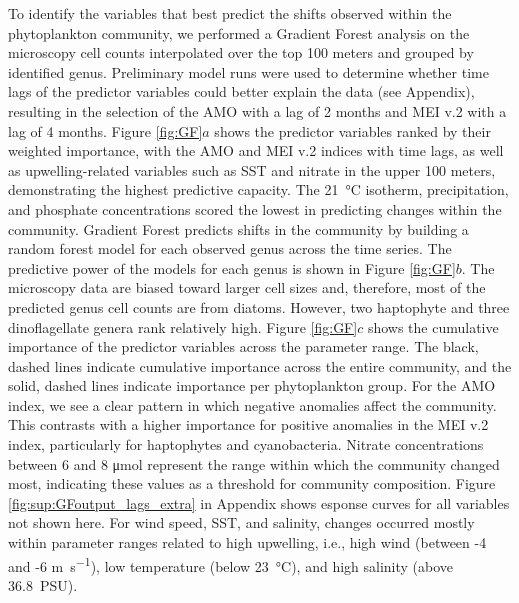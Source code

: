\documentclass[draft]{agujournal2019}
\begin{document}
To identify the variables that best predict the shifts observed within the phytoplankton community, we performed a Gradient Forest analysis on the microscopy cell counts interpolated over the top 100 meters and grouped by identified genus. Preliminary model runs were used to determine whether time lags of the predictor variables could better explain the data (see Appendix), resulting in the selection of the AMO with a lag of 2 months and MEI v.2 with a lag of 4 months. Figure \ref{fig:GF}$a$ shows the predictor variables ranked by their weighted importance, with the AMO and MEI v.2 indices with time lags, as well as upwelling-related variables such as SST and nitrate in the upper 100 meters, demonstrating the highest predictive capacity. The \qty{21}{\celsius} isotherm, precipitation, and phosphate concentrations scored the lowest in predicting changes within the community. Gradient Forest predicts shifts in the community by building a random forest model for each observed genus across the time series. The predictive power of the models for each genus is shown in Figure \ref{fig:GF}$b$. The microscopy data are biased toward larger cell sizes and, therefore, most of the predicted genus cell counts are from diatoms. However, two haptophyte and three dinoflagellate genera rank relatively high.
Figure \ref{fig:GF}$c$ shows the cumulative importance of the predictor variables across the parameter range. The black, dashed lines indicate cumulative importance across the entire community, and the solid, dashed lines indicate importance per phytoplankton group. For the AMO index, we see a clear pattern in which negative anomalies affect the community. This contrasts with a higher importance for positive anomalies in the MEI v.2 index, particularly for haptophytes and cyanobacteria. Nitrate concentrations between 6 and 8 \unit{\micro \mole} represent the range within which the community changed most, indicating these values as a threshold for community composition. Figure \ref{fig:sup:GFoutput_lags_extra} in Appendix shows esponse curves for all variables not shown here. For wind speed, SST, and salinity, changes occurred mostly within parameter ranges related to high upwelling, i.e., high wind (between -4 and -6 \unit{m.s^{-1}}), low temperature (below \qty{23}{\celsius}), and high salinity (above \qty{36.8}{PSU}). 
\end{document}
